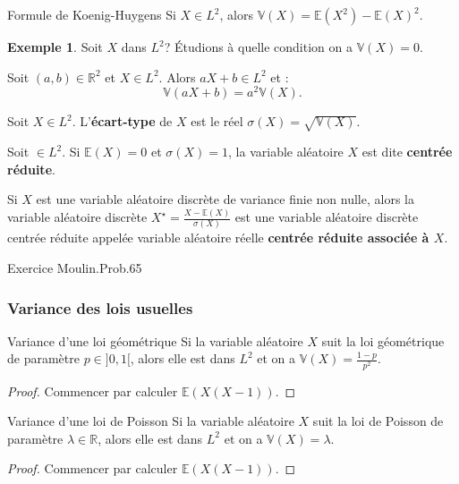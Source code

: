 \documentclass[french]{article}
\newcommand{\R}{\mathbb{R}}
\newcommand{\E}{\mathbb{E}}
\newcommand{\V}{\mathbb{V}}
\theoremstyle{plain}
\theoremstyle{definition}
\newtheorem*{ex}{Exemple}
\theoremstyle{remark}
\begin{document}
\begin{thm}{Formule de Koenig-Huygens}
	Si $X\in L^2$, alors $\V(X)=\E(X^2)-\E(X)^2$.
\end{thm}

\begin{ex}
	Soit $X$ dans $L^2$? Étudions à quelle condition on a $\V(X)=0$.
\end{ex}

\begin{thm}{}%
	Soit $(a,b)\in\R^2$ et $X\in L^2$. Alors $aX+b\in L^2$ et : $$\V(aX+b)=a^2\V(X).$$
\end{thm}

\begin{dfn}
	Soit $X\in L^2$. L'\textbf{écart-type} de $X$ est le réel $\sigma(X)=\sqrt{\V(X)}$.
\end{dfn}

\begin{dfn}
	Soit $\in L^2$. Si $\E(X)=0$ et $\sigma(X)=1$, la variable aléatoire $X$ est dite \textbf{centrée réduite}.
\end{dfn}

\begin{thm}{}%
	Si $X$ est une variable aléatoire discrète de variance finie non nulle, alors la variable aléatoire discrète $X^\star=\displaystyle\frac{X-\E(X)}{\sigma(X)}$ est une variable aléatoire discrète centrée réduite appelée variable aléatoire réelle \textbf{centrée réduite associée à $X$}.
\end{thm}

Exercice Moulin.Prob.65

\subsubsection*{Variance des lois usuelles}

\begin{thm}{Variance d'une loi géométrique}%
	Si la variable aléatoire $X$ suit la loi géométrique de paramètre $p\in]0,1[$, alors elle est dans $L^2$ et on a $\V(X)=\displaystyle\frac{1-p}{p^2}$.
\end{thm}
\begin{proof}
	Commencer par calculer $\E(X(X-1))$.
\end{proof}

\begin{thm}{Variance d'une loi de Poisson}%
	Si la variable aléatoire $X$ suit la loi de Poisson de paramètre $\lambda\in\R$, alors elle est dans $L^2$ et on a $\V(X)=\lambda$.
\end{thm}
\begin{proof}
	Commencer par calculer $\E(X(X-1))$.
\end{proof}
\end{document}
